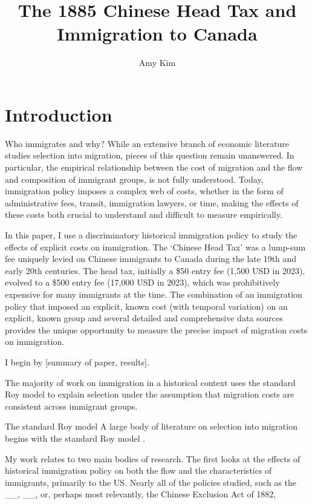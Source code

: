 \documentclass[12pt]{article}
\title{The 1885 Chinese Head Tax and Immigration to Canada}
\author{Amy Kim}
\begin{document}
\maketitle

\section{Introduction}
Who immigrates and why? While an extensive branch of economic literature studies selection into migration, pieces of this question remain unanswered. In particular, the empirical relationship between the cost of migration and the flow and composition of immigrant groups, is not fully understood. Today, immigration policy imposes a complex web of costs, whether in the form of administrative fees, transit, immigration lawyers, or time, making the effects of these costs both crucial to understand and difficult to measure empirically. 

In this paper, I use a discriminatory historical immigration policy to study the effects of explicit costs on immigration. The `Chinese Head Tax' was a lump-sum fee uniquely levied on Chinese immigrants to Canada during the late 19th and early 20th centuries. The head tax, initially a \$50 entry fee (1,500 USD in 2023), evolved to a \$500 entry fee (17,000 USD in 2023), which was prohibitively expensive for many immigrants at the time. The combination of an immigration policy that imposed an explicit, known cost (with temporal variation) on an explicit, known group and several detailed and comprehensive data sources provides the unique opportunity to measure the precise impact of migration costs on immigration. 

I begin by [summary of paper, results].

The majority of work on immigration in a historical context uses the standard Roy model to explain selection under the assumption that migration costs are consistent across immigrant groups. 

The standard Roy model \citet{roy1951} 
A large body of literature on selection into migration begins with the standard Roy model \citet{roy1951}. 



My work relates to two main bodies of research. The first looks at the effects of historical immigration policy on both the flow and the characteristics of immigrants, primarily to the US. Nearly all of the policies studied, such as the __, __, or, perhaps most relevantly, the Chinese Exclusion Act of 1882,  
\end{document}
